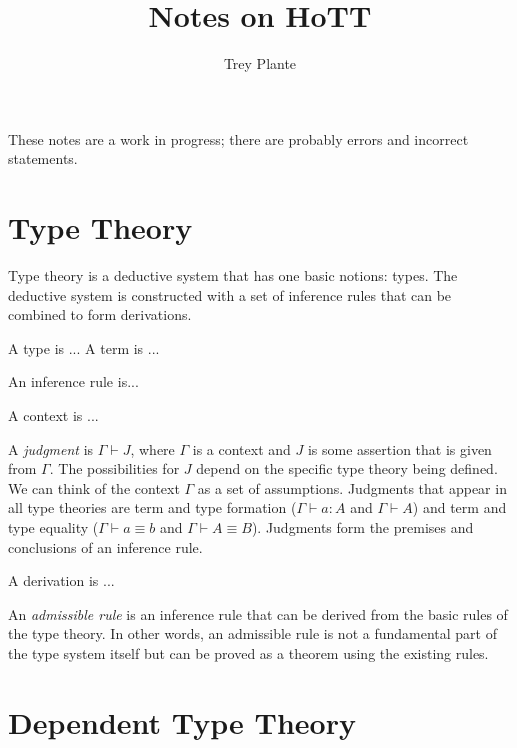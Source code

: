 \documentclass{article}
\title{Notes on HoTT}
\author{Trey Plante}
\begin{document}
\maketitle
These notes are a work in progress; there are probably errors and incorrect statements.

\section{Type Theory}

Type theory is a deductive system that has one basic notions: types. The deductive system is constructed with a set of inference rules that can be combined to form derivations.

\begin{definition}
  A type is ... A term is ...
\end{definition}

\begin{definition}
  An inference rule is...
\end{definition}

\begin{definition}
  A context is ...
\end{definition}

\begin{definition}\label{dfn: judgment}
  A \emph{judgment} is $\Gamma \vdash J$, where $\Gamma$ is a context and $J$ is some assertion that is given from $\Gamma$. The possibilities for $J$ depend on the specific type theory being defined. We can think of the context $\Gamma$ as a set of assumptions. Judgments that appear in all type theories are term and type formation ($\Gamma \vdash a : A$ and $\Gamma \vdash A$) and term and type equality ($\Gamma \vdash a \equiv b$ and $\Gamma \vdash A \equiv B$). Judgments form the premises and conclusions of an inference rule.
\end{definition}

\begin{definition}
  A derivation is ...
\end{definition}

\begin{definition}
  An \emph{admissible rule} is an inference rule that can be derived from the basic rules of the type theory. In other words, an admissible rule is not a fundamental part of the type system itself but can be proved as a theorem using the existing rules.
\end{definition}

\section{Dependent Type Theory}
\end{document}
